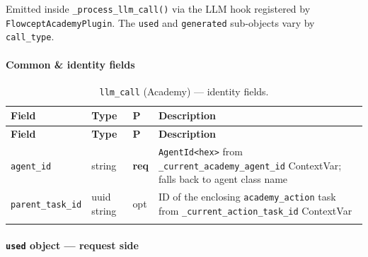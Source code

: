 \documentclass[11pt,a4paper]{article}
\newcommand{\opt}{\textcolor{optred}{opt}}
\newcommand{\req}{\textbf{req}}
\newcommand{\subtype}[1]{\texttt{\textcolor{subtypeblue}{#1}}}
\begin{document}
Emitted inside \texttt{\_process\_llm\_call()} via the LLM hook registered by
\texttt{FlowceptAcademyPlugin}. The \texttt{used} and \texttt{generated}
sub-objects vary by \texttt{call\_type}.

\paragraph{Common \& identity fields}

\begin{longtable}{L{4cm} L{2.5cm} C{1.2cm} L{6.5cm}}
\toprule
\textbf{Field} & \textbf{Type} & \textbf{P} & \textbf{Description} \\
\midrule
\endfirsthead
\toprule \textbf{Field} & \textbf{Type} & \textbf{P} & \textbf{Description} \\
\midrule
\endhead
\bottomrule
\endlastfoot

\texttt{agent\_id}
  & string & \req
  & \texttt{AgentId<hex>} from \texttt{\_current\_academy\_agent\_id} ContextVar;
    falls back to agent class name \\
\texttt{parent\_task\_id}
  & uuid string & \opt
  & ID of the enclosing \subtype{academy\_action} task from
    \texttt{\_current\_action\_task\_id} ContextVar \\

\caption{\subtype{llm\_call} (Academy) — identity fields.}
\end{longtable}

\paragraph{\texttt{used} object — request side}
\end{document}
